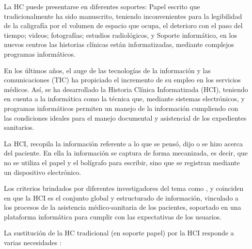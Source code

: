 La HC puede presentarse en diferentes soportes: Papel escrito que tradicionalmente ha sido manuscrito, teniendo inconvenientes para la legibilidad de la caligrafía por el volumen de espacio que ocupa, el deterioro con el paso del tiempo; videos; fotografías; estudios radiológicos, y Soporte informático, en los nuevos centros las historias clínicas están informatizadas, mediante complejos programas informáticos.  

En los últimos años, el auge de las tecnologías de la información y las comunicaciones (TIC) ha propiciado el incremento de su empleo en los servicios médicos. Así, se ha desarrollado la Historia Clínica Informatizada (HCI), teniendo en cuenta a la informática como la técnica que, mediante sistemas electrónicos, y programas informáticos permiten un manejo de la información cumpliendo con las condiciones ideales para el manejo documental y asistencial de los expedientes sanitarios. 

La HCI, recopila la información referente a lo que se pensó, dijo o se hizo acerca del paciente. En ella la información se captura de forma mecanizada, es decir, que no se utiliza el papel y el bolígrafo para escribir, sino que se registran mediante un dispositivo electrónico.     

Los criterios brindados por diferentes investigadores del tema como   ,   y  coinciden en que la HCI es el conjunto global y estructurado de información, vinculado a los procesos de la asistencia médico-sanitaria de los pacientes, soportado en una plataforma informática para cumplir con las expectativas de los usuarios. 

La sustitución de la HC tradicional (en soporte papel) por la HCI responde a varias necesidades  :  


